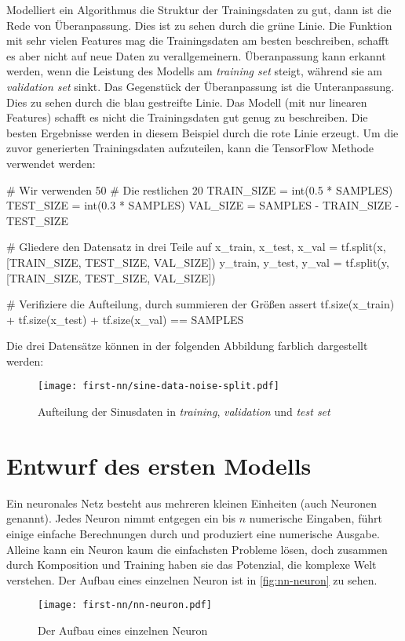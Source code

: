 \noindent
Modelliert ein Algorithmus die Struktur der Trainingsdaten zu gut, dann
ist die Rede von Überanpassung. Dies ist zu sehen
durch die grüne Linie. Die Funktion mit sehr vielen Features
mag die Trainingsdaten am besten beschreiben,
schafft es aber nicht auf neue Daten zu verallgemeinern.
Überanpassung kann erkannt werden, wenn die Leistung des Modells am
\textit{training set} steigt, während sie am \textit{validation set}
sinkt. Das Gegenstück der Überanpassung ist die
Unteranpassung. Dies zu sehen durch die blau gestreifte Linie.
Das Modell (mit nur linearen Features)
schafft es nicht die Trainingsdaten gut genug zu beschreiben.
Die besten Ergebnisse werden in diesem Beispiel durch die rote Linie erzeugt.
Um die zuvor generierten Trainingsdaten aufzuteilen,
kann die TensorFlow Methode 
verwendet werden:
\begin{pythoncode}
# Wir verwenden 50%
# Die restlichen 20%
TRAIN_SIZE = int(0.5 * SAMPLES)
TEST_SIZE = int(0.3 * SAMPLES)
VAL_SIZE = SAMPLES - TRAIN_SIZE - TEST_SIZE

# Gliedere den Datensatz in drei Teile auf
x_train, x_test, x_val = tf.split(x, [TRAIN_SIZE, TEST_SIZE, VAL_SIZE])
y_train, y_test, y_val = tf.split(y, [TRAIN_SIZE, TEST_SIZE, VAL_SIZE])

# Verifiziere die Aufteilung, durch summieren der Größen
assert tf.size(x_train) + tf.size(x_test) + tf.size(x_val) == SAMPLES
\end{pythoncode}
Die drei Datensätze können in der folgenden Abbildung farblich dargestellt werden:
\begin{figure}[h!]
  \centering
  \texttt{[image: first-nn/sine-data-noise-split.pdf]}
  \caption{Aufteilung der Sinusdaten in
  \textit{training}, \textit{validation} und \textit{test set}}
\end{figure}

\section{Entwurf des ersten Modells}
\label{sec:modellentwurf}
Ein neuronales Netz besteht aus mehreren kleinen Einheiten (auch Neuronen genannt).
Jedes Neuron nimmt entgegen ein bis $n$ numerische Eingaben, führt einige
einfache Berechnungen durch und produziert eine numerische Ausgabe.
Alleine kann ein Neuron kaum die einfachsten Probleme lösen, doch zusammen
durch Komposition und Training haben sie das Potenzial,
die komplexe Welt verstehen.
Der Aufbau eines einzelnen Neuron ist in \autoref{fig:nn-neuron} zu sehen.
\begin{figure}[h!]
  \centering
  \texttt{[image: first-nn/nn-neuron.pdf]}
  \caption{Der Aufbau eines einzelnen Neuron}
  \label{fig:nn-neuron}
\end{figure}

